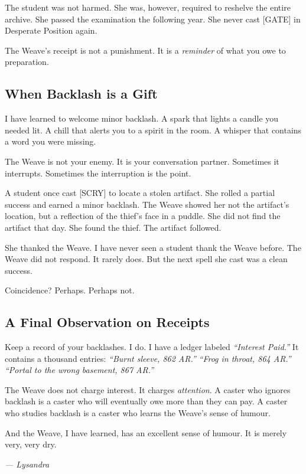 The student was not harmed. She was, however, required to reshelve the entire archive. She passed the examination the following year. She never cast [GATE] in Desperate Position again.

The Weave's receipt is not a punishment. It is a \emph{reminder} of what you owe to preparation.

\subsection{When Backlash is a Gift}

I have learned to welcome minor backlash. A spark that lights a candle you needed lit. A chill that alerts you to a spirit in the room. A whisper that contains a word you were missing.

The Weave is not your enemy. It is your conversation partner. Sometimes it interrupts. Sometimes the interruption is the point.

A student once cast [SCRY] to locate a stolen artifact. She rolled a partial success and earned a minor backlash. The Weave showed her not the artifact's location, but a reflection of the thief's face in a puddle. She did not find the artifact that day. She found the thief. The artifact followed.

She thanked the Weave. I have never seen a student thank the Weave before. The Weave did not respond. It rarely does. But the next spell she cast was a clean success.

Coincidence? Perhaps. Perhaps not.

\subsection{A Final Observation on Receipts}

Keep a record of your backlashes. I do. I have a ledger labeled \emph{``Interest Paid.''} It contains a thousand entries: \emph{``Burnt sleeve, 862 AR.''} \emph{``Frog in throat, 864 AR.''} \emph{``Portal to the wrong basement, 867 AR.''}

The Weave does not charge interest. It charges \emph{attention}. A caster who ignores backlash is a caster who will eventually owe more than they can pay. A caster who studies backlash is a caster who learns the Weave's sense of humour.

And the Weave, I have learned, has an excellent sense of humour. It is merely very, very dry.

\textit{--- Lysandra}
